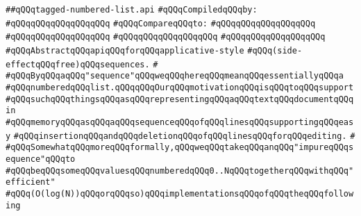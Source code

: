 \label{src/lib/src/tagged-numbered-list.api}
\verb|##qQQqtagged-numbered-list.api|\newline
\newline
\verb|#qQQqCompiledqQQqby:|\newline
\verb|#qQQqqQQqqQQqqQQqqQQq|\newline
\newline
\verb|#qQQqCompareqQQqto:|\newline
\verb|#qQQqqQQqqQQqqQQqqQQq|\newline
\verb|#qQQqqQQqqQQqqQQqqQQq|\newline
\verb|#qQQqqQQqqQQqqQQqqQQq|\newline
\verb|#qQQqqQQqqQQqqQQqqQQq|\newline
\newline
\newline
\newline
\newline
\verb|#qQQqAbstractqQQqapiqQQqforqQQqapplicative-style|\newline
\verb|#qQQq(side-effectqQQqfree)qQQqsequences.|\newline
\verb|#|\newline
\verb|#qQQqByqQQqaqQQq"sequence"qQQqweqQQqhereqQQqmeanqQQqessentiallyqQQqa|\newline
\verb|#qQQqnumberedqQQqlist.qQQqqQQqOurqQQqmotivationqQQqisqQQqtoqQQqsupport|\newline
\verb|#qQQqsuchqQQqthingsqQQqasqQQqrepresentingqQQqaqQQqtextqQQqdocumentqQQqin|\newline
\verb|#qQQqmemoryqQQqasqQQqaqQQqsequenceqQQqofqQQqlinesqQQqsupportingqQQqeasy|\newline
\verb|#qQQqinsertionqQQqandqQQqdeletionqQQqofqQQqlinesqQQqforqQQqediting.|\newline
\verb|#|\newline
\verb|#qQQqSomewhatqQQqmoreqQQqformally,qQQqweqQQqtakeqQQqanqQQq"impureqQQqsequence"qQQqto|\newline
\verb|#qQQqbeqQQqsomeqQQqvaluesqQQqnumberedqQQq0..NqQQqtogetherqQQqwithqQQq"efficient"|\newline
\verb|#qQQq(O(log(N))qQQqorqQQqso)qQQqimplementationsqQQqofqQQqtheqQQqfollowing|\newline
